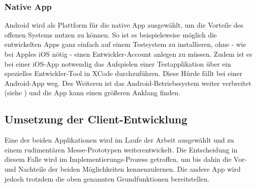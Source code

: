 \subsubsection*{Native App}
\label{ssec:aufgabenstellung:nat-app}
Android wird als Plattform für die native App ausgewählt, um die Vorteile des offenen Systems nutzen zu können. So ist es beispielsweise möglich die entwickelten Apps ganz einfach auf einem Testsystem zu installieren, ohne - wie bei Apples iOS nötig - einen Entwickler-Account anlegen zu müssen. Zudem ist es bei einer iOS-App notwendig das Aufspielen einer Testapplikation über ein spezielles Entwickler-Tool in XCode durchzuführen. Diese Hürde fällt bei einer Android-App weg. Des Weiteren ist das Android-Betriebssystem weiter verbreitet (siehe \citep{Statista-SmartphoneVerteilung}) und die App kann einen größeren Anklang finden.
\subsection{Umsetzung der Client-Entwicklung}
\label{ssec:umsetzung-client-entwicklung}
Eine der beiden Applikationen wird im Laufe der Arbeit ausgewählt und zu einem rudimentären Messe-Prototypen weiterentwickelt. Die Entscheidung in diesem Falle wird im Implementierungs-Prozess getroffen, um bis dahin die Vor- und Nachteile der beiden Möglichkeiten kennenzulernen. Die andere App wird jedoch trotzdem die oben genannten Grundfunktionen bereitstellen.